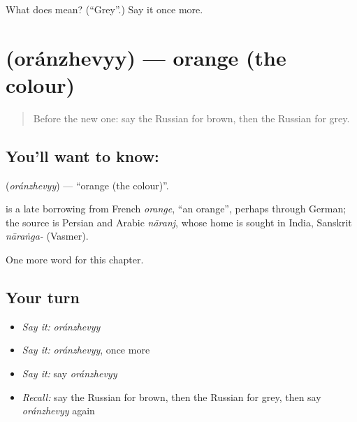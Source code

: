\begin{tcolorbox}[breakable,colback=teal!4,colframe=teal!35!black,title={Before you move on}]
What does  mean? (\textquotedblleft{}Grey\textquotedblright{}.) Say it once more.
\end{tcolorbox}
\section[\texorpdfstring{\ru{оранжевый} (oránzhevyy)}{оранжевый (oránzhevyy)}]{ (oránzhevyy) — orange (the colour)}

\label{lesson:RU-C124-orange}



\begin{quote}
Before the new one: say the Russian for brown, then the Russian for grey.
\end{quote}

\subsection*{You'll want to know: }
\textbf{} (\emph{oránzhevyy}) — \textquotedblleft{}orange (the colour)\textquotedblright{}.

\begin{cousinweb}
\textbf{} is a late borrowing from French \emph{orange}, \textquotedblleft{}an orange\textquotedblright{}, perhaps through German; the source is Persian and Arabic \emph{nāranj}, whose home is sought in India, Sanskrit \emph{nāraṅga-} (Vasmer).
\end{cousinweb}

\begin{grammarlens}[title={What you've built}]
One more word for this chapter.
\end{grammarlens}

\subsection*{Your turn}
\begin{itemize}
\raggedright
  \item \emph{Say it:} \emph{oránzhevyy}
  \item \emph{Say it:} \emph{oránzhevyy}, once more
  \item \emph{Say it:} say \emph{oránzhevyy}
  \item \emph{Recall:} say the Russian for brown, then the Russian for grey, then say \emph{oránzhevyy} again
\end{itemize}

